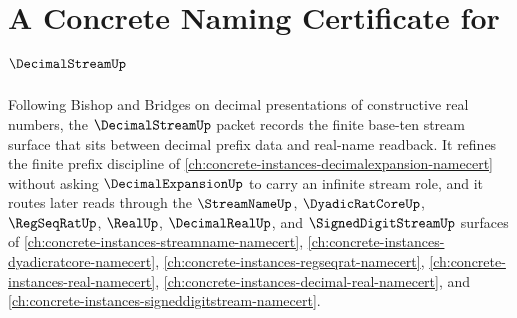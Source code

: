 \chapter{A Concrete Naming Certificate for $\DecimalStreamUp$}
\label{ch:concrete-instances-decimal-stream-namecert}

Following Bishop and Bridges on decimal presentations of constructive real numbers, the $\DecimalStreamUp$ packet records the finite base-ten stream surface that sits between decimal prefix data and real-name readback. It refines the finite prefix discipline of \autoref{ch:concrete-instances-decimalexpansion-namecert} without asking $\DecimalExpansionUp$ to carry an infinite stream role, and it routes later reads through the $\StreamNameUp$, $\DyadicRatCoreUp$, $\RegSeqRatUp$, $\RealUp$, $\DecimalRealUp$, and $\SignedDigitStreamUp$ surfaces of \autoref{ch:concrete-instances-streamname-namecert}, \autoref{ch:concrete-instances-dyadicratcore-namecert}, \autoref{ch:concrete-instances-regseqrat-namecert}, \autoref{ch:concrete-instances-real-namecert}, \autoref{ch:concrete-instances-decimal-real-namecert}, and \autoref{ch:concrete-instances-signeddigitstream-namecert}.

